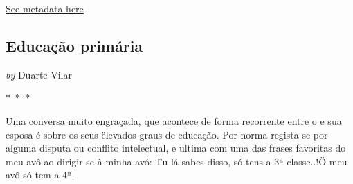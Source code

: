
\hyperref[table:\arabic{tablecounter}]{See metadata here}

\newpage

\begin{center}

    \section{  Educação primária  }

    
            
                \textit{by} Duarte Vilar
            
        

     
    
    

$\ast$~$\ast$~$\ast$



\end{center}

\begin{center}
    \begin{minipage}{0.9\textwidth}
        \setlength{\parskip}{0.2cm}
        \setlength{\parindent}{0cm}
        \fontsize{12pt}{14pt}\selectfont
        


Uma conversa muito engraçada, que acontece de forma recorrente entre o e
sua esposa é sobre os seus \"elevados graus de educação. Por norma
regista-se por alguma disputa ou conflito intelectual, e ultima com uma
das frases favoritas do meu avô ao dirigir-se à minha avó: \"Tu lá sabes
disso, só tens a 3ª classe..!\" O meu avô só tem a 4ª.

    \end{minipage}
\end{center}

